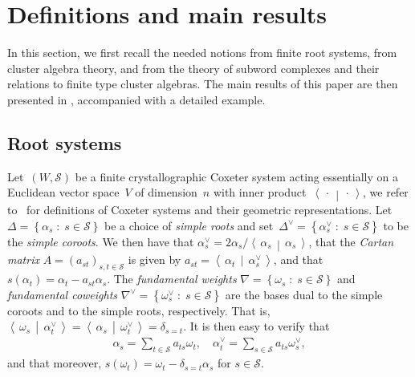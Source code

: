 \documentclass[ALCO,Unicode,ThmDefs]{cedram}
\newcommand{\Dfn}[1]{\emph{#1}}
\newcommand{\sref}{\mathcal{S}}
\newcommand{\set}[2]{\left\{ #1 \;:\; #2 \right\}}
\newcommand{\dotprod}[2]{\left\langle \, #1 \,\middle|\, #2 \, \right\rangle}
\begin{document}
\section{Definitions and main results}\label{sec:defintionsresults}

In this section, we first recall the needed notions from finite root systems, from cluster algebra theory, and from the theory of subword complexes and their relations to finite type cluster algebras. The main results of this paper are then presented in , accompanied with a detailed example.

\subsection{Root systems}\label{sec:rootsystem}

Let~$(W,\sref)$ be a finite crystallographic Coxeter system acting essentially on a Euclidean vector space~$V$ of dimension~$n$ with inner product~$\dotprod{\cdot}{\cdot}$, we refer to~\cite[Part~II]{Hum1990} for definitions of Coxeter systems and their geometric representations. Let $\Delta = \set{\alpha_s}{s \in \sref}$ be a choice of \Dfn{simple roots} and set~$\Delta^\vee = \set{\alpha_s^\vee}{s \in \sref}$ to be the \Dfn{simple coroots}. We then have that $\alpha_s^\vee = 2\alpha_s / \dotprod{\alpha_s}{\alpha_s}$, that the \Dfn{Cartan matrix} $A = (a_{st})_{s,t \in \sref}$ is given by $a_{st} = \dotprod{\alpha_t}{\alpha_s^\vee}$, and that $s(\alpha_t) = \alpha_t - a_{st} \alpha_s$. The \Dfn{fundamental weights} $\nabla = \set{\omega_s}{s \in \sref}$ and \Dfn{fundamental coweights} $\nabla^\vee = \set{\omega_s^\vee}{s \in \sref}$ are the bases dual to the simple coroots and to the simple roots, respectively. That is, $\dotprod{\omega_s}{\alpha_t^\vee} = \dotprod{\alpha_s}{\omega_t^\vee} = \delta_{s=t}$. It is then easy to verify that
\begin{align}
\alpha_s = \sum_{t \in \sref}a_{ts}\omega_t, \quad \alpha_t^\vee = \sum_{s \in \sref}a_{ts}\omega_s^\vee, \label{eq:rootweight}
\end{align}
and that moreover, $s(\omega_t) = \omega_t - \delta_{s=t}\alpha_s$ for $s \in \sref$.
\end{document}
